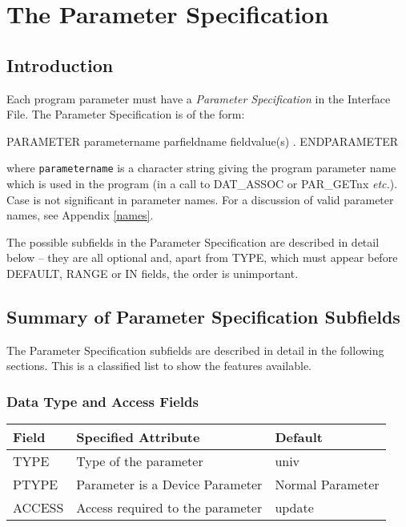 \documentclass[twoside,11pt,nolof]{starlink}
\begin{document}
\section{The Parameter Specification}

\subsection{Introduction}

Each program parameter must have a \emph{Parameter Specification} in the
Interface File. The Parameter Specification is of the form:
\begin{terminalv}
PARAMETER parametername
   parfieldname fieldvalue(s)
         .
ENDPARAMETER
\end{terminalv}
where \texttt{parametername} is a character string giving the program parameter
name which is used in the program (in a call to DAT\_ASSOC or
PAR\_GETnx \emph{etc.}). Case is not significant in parameter names.
For a discussion of valid parameter names, see Appendix \ref{names}.

The possible subfields in the Parameter Specification are described in detail
below -- they are all optional and, apart from
TYPE, which must appear before DEFAULT, RANGE or IN fields, the order
is unimportant.

\subsection{Summary of Parameter Specification Subfields
}

The Parameter Specification subfields are described in detail in the following
sections. This is a classified list to show the features available.

\subsubsection*{Data Type and Access Fields}
\begin{center}
\begin{tabular}{|l|l|l|} \hline
Field & Specified Attribute & Default\\
\hline
TYPE & Type of the parameter & univ \\
PTYPE & Parameter is a Device Parameter & Normal Parameter \\
ACCESS & Access required to the parameter & update \\
\hline
\end{tabular}
\end{center}
\end{document}
